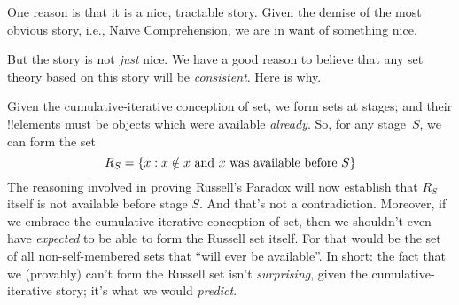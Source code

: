 \documentclass[../../../include/open-logic-section]{subfiles}
\begin{document}
One reason is that it is a nice, tractable story. Given the demise of
the most obvious story, i.e., Na\"ive Comprehension, we are in want of
something nice. 

But the story is not \emph{just} nice. We have a good reason to
believe that any set theory based on this story will be
\emph{consistent}. Here is why. 

Given the cumulative-iterative conception of set, we form sets at
stages; and their !!{element}s must be objects which were available
\emph{already}. So, for any stage~$S$, we can form the set 
\[
	R_S = \{ x : x \notin x \text{ and $x$ was available before $S$} \}
\]
The reasoning involved in proving Russell's Paradox will now establish
that $R_S$ itself is not available before stage $S$. And that's not a
contradiction. Moreover, if we embrace the cumulative-iterative
conception of set, then we shouldn't even have \emph{expected} to be
able to form the Russell set itself. For that would be the set of all
non-self-membered sets that ``will ever be available''. In short: the
fact that we (provably) can't form the Russell set isn't
\emph{surprising}, given the cumulative-iterative story; it's what we
would \emph{predict}.

%

\end{document}
